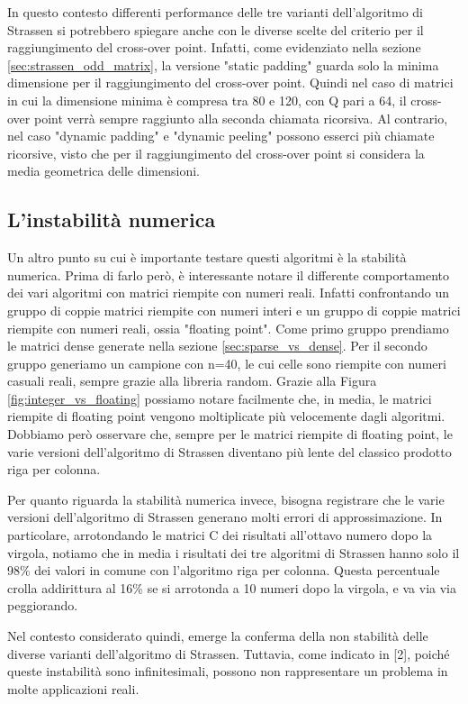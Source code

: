 \documentclass[10pt,a4paper,twoside]{tau-book}
\begin{document}
In questo contesto differenti performance delle tre varianti dell'algoritmo di Strassen si potrebbero spiegare anche con le diverse scelte del criterio per il raggiungimento del cross-over point. Infatti, come evidenziato nella sezione \ref{sec:strassen_odd_matrix}, la versione "static padding" guarda solo la minima dimensione per il raggiungimento del cross-over point. Quindi nel caso di matrici in cui la dimensione minima è compresa tra 80 e 120, con Q pari a 64, il cross-over point verrà sempre raggiunto alla seconda chiamata ricorsiva. Al contrario, nel caso "dynamic padding" e "dynamic peeling" possono esserci più chiamate ricorsive, visto che per il raggiungimento del cross-over point si considera la media geometrica delle dimensioni.

\subsection{L'instabilità numerica}

Un altro punto su cui è importante testare questi algoritmi è la stabilità numerica. Prima di farlo però, è interessante notare il differente comportamento dei vari algoritmi con matrici riempite con numeri reali. Infatti confrontando un gruppo di coppie matrici riempite con numeri interi e un gruppo di coppie matrici riempite con numeri reali, ossia "floating point". Come primo gruppo prendiamo le matrici dense generate nella sezione \ref{sec:sparse_vs_dense}. Per il secondo gruppo generiamo un campione con n=40, le cui celle sono riempite con numeri casuali reali, sempre grazie alla libreria random. Grazie alla Figura \ref{fig:integer_vs_floating} possiamo notare facilmente che, in media, le matrici riempite di floating point vengono moltiplicate più velocemente dagli algoritmi. Dobbiamo però osservare che, sempre per le matrici riempite di floating point, le varie versioni dell'algoritmo di Strassen diventano più lente del classico prodotto riga per colonna.

Per quanto riguarda la stabilità numerica invece, bisogna registrare che le varie versioni dell'algoritmo di Strassen generano molti errori di approssimazione. In particolare, arrotondando le matrici C dei risultati all'ottavo numero dopo la virgola, notiamo che in media i risultati dei tre algoritmi di Strassen hanno solo il 98\% dei valori in comune con l'algoritmo riga per colonna. Questa percentuale crolla addirittura al 16\% se si arrotonda a 10 numeri dopo la virgola, e va via via peggiorando.

Nel contesto considerato quindi, emerge la conferma della non stabilità delle diverse varianti dell'algoritmo di Strassen. Tuttavia, come indicato in [2], poiché queste instabilità sono infinitesimali, possono non rappresentare un problema in molte applicazioni reali.
\end{document}

